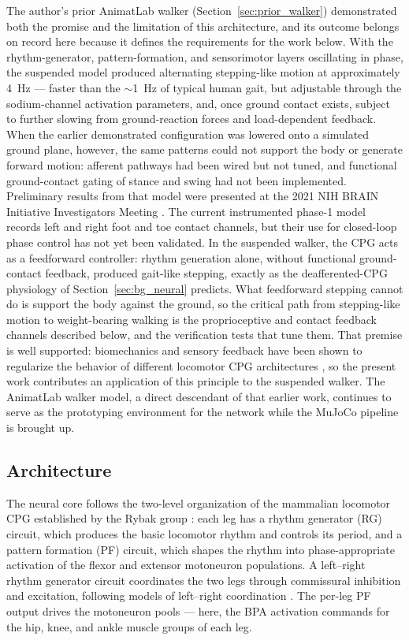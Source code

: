 The author's prior AnimatLab walker (Section~\ref{sec:prior_walker}) demonstrated both the promise and the limitation of this architecture, and its outcome belongs on record here because it defines the requirements for the work below. With the rhythm-generator, pattern-formation, and sensorimotor layers oscillating in phase, the suspended model produced alternating stepping-like motion at approximately 4~Hz --- faster than the $\sim$1~Hz of typical human gait, but adjustable through the sodium-channel activation parameters, and, once ground contact exists, subject to further slowing from ground-reaction forces and load-dependent feedback. When the earlier demonstrated configuration was lowered onto a simulated ground plane, however, the same patterns could not support the body or generate forward motion: afferent pathways had been wired but not tuned, and functional ground-contact gating of stance and swing had not been implemented. Preliminary results from that model were presented at the 2021 NIH BRAIN Initiative Investigators Meeting \citep{bolenTorqueValuesArtificialKnee2021June15-17}. The current instrumented phase-1 model records left and right foot and toe contact channels, but their use for closed-loop phase control has not yet been validated. In the suspended walker, the CPG acts as a feedforward controller: rhythm generation alone, without functional ground-contact feedback, produced gait-like stepping, exactly as the deafferented-CPG physiology of Section~\ref{sec:bg_neural} predicts. What feedforward stepping cannot do is support the body against the ground, so the critical path from stepping-like motion to weight-bearing walking is the proprioceptive and contact feedback channels described below, and the verification tests that tune them. That premise is well supported: biomechanics and sensory feedback have been shown to regularize the behavior of different locomotor CPG architectures \citep{deng_biomechanical_2022}, so the present work contributes an application of this principle to the suspended walker. The AnimatLab walker model, a direct descendant of that earlier work, continues to serve as the prototyping environment for the network while the MuJoCo pipeline is brought up.

\subsection{Architecture}

The neural core follows the two-level organization of the mammalian locomotor CPG established by the Rybak group \citep{rybak_modelling_2006, mccrea_organization_2008, rybak_organization_2015}: each leg has a rhythm generator (RG) circuit, which produces the basic locomotor rhythm and controls its period, and a pattern formation (PF) circuit, which shapes the rhythm into phase-appropriate activation of the flexor and extensor motoneuron populations. A left--right rhythm generator circuit coordinates the two legs through commissural inhibition and excitation, following models of left--right coordination \citep{molkov_mechanisms_2015, danner_central_2016}. The per-leg PF output drives the motoneuron pools --- here, the BPA activation commands for the hip, knee, and ankle muscle groups of each leg.

